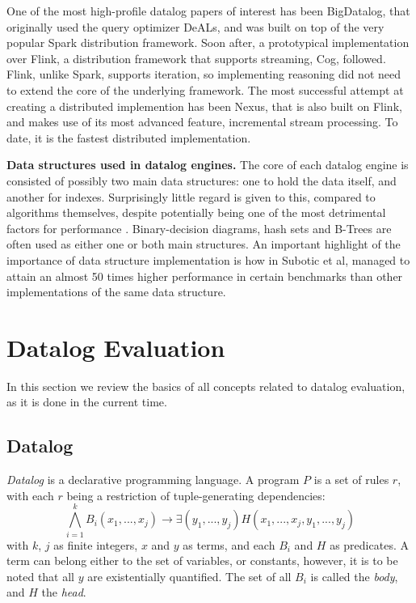 \documentclass[manuscript,screen,review]{acmart}
\theoremstyle{definition}
\begin{document}
One of the most high-profile datalog papers of interest has been BigDatalog\cite{bigdatalog}, that
originally used the query optimizer DeALs, and was built on top of the very popular Spark\cite{spark}
distribution framework. Soon after, a prototypical implementation\cite{cog} over Flink\cite{flink},
a distribution framework that supports streaming, Cog, followed. Flink, unlike Spark, supports
iteration, so implementing reasoning did not need to extend the core of the underlying framework. The most
successful attempt at creating a distributed implemention has been Nexus\cite{nexus}, that is also built on Flink,
and makes use of its most advanced feature, incremental stream processing. To date, it is the fastest distributed
implementation.

\textbf{Data structures used in datalog engines.} The core of each datalog engine is consisted of possibly
two main data structures: one to hold the data itself, and another for indexes. Surprisingly little regard is given to
this, compared to algorithms themselves, despite potentially being one of the most detrimental factors for performance
. Binary-decision diagrams\cite{bddbddb}, hash sets\cite{microzee} and B-Trees\cite{souffle_btree} are often used as
either one or both main structures. An important highlight of the importance of data structure implementation is how
in \cite{souffle_btree} Subotic et al, managed to attain an almost 50 times higher performance in certain benchmarks
than other implementations of the same data structure.

\section{Datalog Evaluation}

In this section we review the basics of all concepts related to datalog evaluation, as it is done in the current time.

\subsection{Datalog}

\textit{Datalog}\cite{all_you_ever_wanted_to_ask} is a declarative programming language. A program $P$ is a set of
rules $r$, with each $r$ being a restriction of tuple-generating dependencies: \[\bigwedge_{i=1}^kB_i(x_1, ..., x_j) \rightarrow \exists (y_1, ..., y_j)H(x_1, ..., x_j, y_1, ..., y_j)\]
with $k$, $j$ as finite integers, $x$ and $y$ as terms, and each $B_i$ and $H$ as predicates. A term can belong
either to the set of variables, or constants, however, it is to be noted that all $y$ are existentially quantified.
The set of all $B_i$ is called the \textit{body}, and $H$ the \textit{head}.
\end{document}
